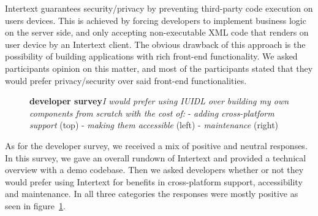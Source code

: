 Intertext guarantees security/privacy by preventing third-party code execution on users devices. This is achieved by forcing developers to implement business logic on the server side, and only accepting non-executable XML code that renders on user device by an Intertext client. The obvious drawback of this approach is the possibility of building applications with rich front-end functionality. We asked participants opinion on this matter, and most of the participants stated that they would prefer privacy/security over said front-end functionalities.


\begin{figure}[H]
\centering
{}
\vspace*{-1mm}
\caption{\textbf{developer survey}\newline\textit{I would prefer using IUIDL over building my own components from scratch with the cost of:}
\newline- \textit{adding cross-platform support} (top)
\newline- \textit{making them accessible} (left)
\newline- \textit{maintenance} (right)} \label{fig:ev_p2_7}
\end{figure}

As for the developer survey, we received a mix of positive and neutral responses. In this survey, we gave an overall rundown of Intertext and provided a technical overview with a demo codebase. Then we asked developers whether or not they would prefer using Intertext for benefits in cross-platform support, accessibility and maintenance. In all three categories the responses were mostly positive as seen in figure~\ref{fig:ev_p2_7}.